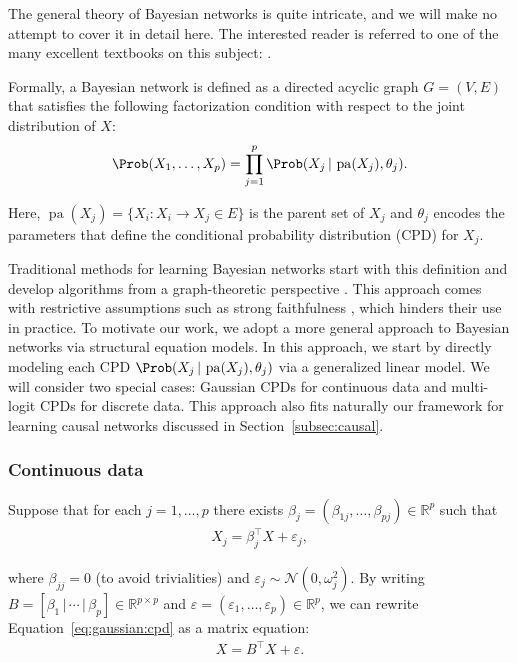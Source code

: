 \documentclass[article]{jss}
\DeclareMathOperator*{\pa}{pa}
\newcommand{\rv}{X}
\newcommand{\err}{\varepsilon}
\newcommand{\normalN}{\mathcal{N}}
\newcommand{\R}{\mathbb{R}}
\newcommand{\dagmat}{B}
\newcommand{\dagcomp}{\beta}
\newcommand{\varcomp}{\omega}
\renewcommand{\|}{\,|\,}
\begin{document}
The general theory of Bayesian networks is quite intricate, and we will make no attempt to cover it in detail here. The interested reader is referred to one of the many excellent textbooks on this subject: \citet{koller2009,spirtes2000,lauritzen1996}. 

Formally, a Bayesian network is defined as a directed acyclic graph $G=(V,E)$ that satisfies the following factorization condition with respect to the joint distribution of $\rv$:
\begin{align*}
\Prob(\rv_{1},\ldots,\rv_{p})
=\prod_{j=1}^{p}\Prob(\rv_{j}\|\pa(\rv_{j}),\theta_{j}).
\end{align*}

\noindent
Here, $\pa(\rv_{j})=\{\rv_{i} : \rv_i\to \rv_j\in E\}$ is the parent set of $\rv_{j}$ and $\theta_{j}$ encodes the parameters that define the conditional probability distribution (CPD) for $X_{j}$.

Traditional methods for learning Bayesian networks start with this definition and develop algorithms from a graph-theoretic perspective \citep{spirtes1991}. This approach comes with restrictive assumptions such as strong faithfulness \citep{uhler2013,zhang2002}, which hinders their use in practice. To motivate our work, we adopt a more general approach to Bayesian networks via structural equation models. In this approach, we start by directly modeling each CPD $\Prob(\rv_{j}\|\pa(\rv_{j}),\theta_{j})$ via a generalized linear model. We will consider two special cases: Gaussian CPDs for continuous data and multi-logit CPDs for discrete data. This approach also fits naturally our framework for learning causal networks discussed in Section~\ref{subsec:causal}.

\subsubsection{Continuous data}

Suppose that for each $j=1,\ldots,p$ there exists $\dagcomp_{j}=(\dagcomp_{1j},\ldots,\dagcomp_{pj})\in\R^{p}$ such that
\begin{align}
\label{eq:gaussian:cpd}
\rv_{j}
= \dagcomp_{j}^{\top}X + \err_{j},
\end{align}

\noindent
where $\dagcomp_{jj}=0$ (to avoid trivialities) and $\err_{j}\sim\normalN(0,\varcomp_{j}^{2})$. By writing $\dagmat=[\dagcomp_{1}\|\cdots\|\dagcomp_{p}]\in\R^{p\times p}$ and $\err=(\err_{1},\ldots,\err_{p})\in\R^{p}$, we can rewrite Equation~\ref{eq:gaussian:cpd} as a matrix equation:
\begin{align}
\label{eq:gaussian:sem}
\rv
= \dagmat^{\top}\rv + \err.
\end{align}
\end{document}
